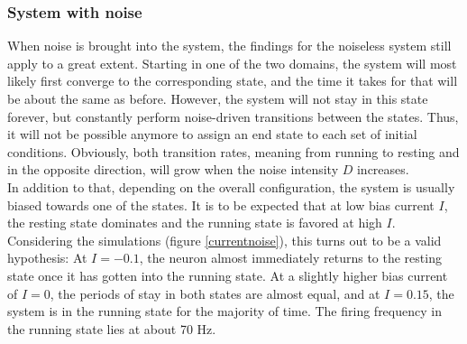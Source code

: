 \documentclass[12pt,a4paper]{article}
\begin{document}
\subsubsection{System with noise}
When noise is brought into the system, the findings for the noiseless system still apply to a great extent. Starting in one of the two domains, the system will most likely first converge to the corresponding state, and the time it takes for that will be about the same as before. However, the system will not stay in this state forever, but constantly perform noise-driven transitions between the states. Thus, it will not be possible anymore to assign an end state to each set of initial conditions. Obviously, both transition rates, meaning from running to resting and in the opposite direction, will grow when the noise intensity $D$ increases. \\
In addition to that, depending on the overall configuration, the system is usually biased towards one of the states. It is to be expected that at low bias current $I$, the resting state dominates and the running state is favored at high $I$. Considering the simulations (figure \ref{currentnoise}), this turns out to be a valid hypothesis: At $I=-0.1$, the neuron almost immediately returns to the resting state once it has gotten into the running state. At a slightly higher bias current of $I=0$, the periods of stay in both states are almost equal, and at $I=0.15$, the system is in the running state for the majority of time. The firing frequency in the running state lies at about 70 Hz.
\end{document}
